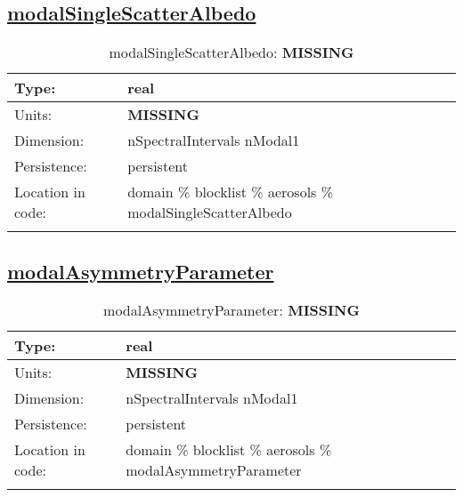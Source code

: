 \subsection[modalSingleScatterAlbedo]{\hyperref[sec:var_tab_aerosols]{modalSingleScatterAlbedo}}
\label{subsec:var_sec_aerosols_modalSingleScatterAlbedo}
\begin{center}
\begin{longtable}{| p{2.0in} | p{4.0in} |}
        \hline 
        Type: & real \\
        \hline 
        Units: & {\bf \color{red} MISSING} \\
        \hline 
        Dimension: & nSpectralIntervals nModal1 \\
        \hline 
        Persistence: & persistent \\
        \hline 
         Location in code: & domain \% blocklist \% aerosols \% modalSingleScatterAlbedo \\
         \hline 
    \caption{modalSingleScatterAlbedo: {\bf \color{red} MISSING}}
\end{longtable}
\end{center}
\subsection[modalAsymmetryParameter]{\hyperref[sec:var_tab_aerosols]{modalAsymmetryParameter}}
\label{subsec:var_sec_aerosols_modalAsymmetryParameter}
\begin{center}
\begin{longtable}{| p{2.0in} | p{4.0in} |}
        \hline 
        Type: & real \\
        \hline 
        Units: & {\bf \color{red} MISSING} \\
        \hline 
        Dimension: & nSpectralIntervals nModal1 \\
        \hline 
        Persistence: & persistent \\
        \hline 
         Location in code: & domain \% blocklist \% aerosols \% modalAsymmetryParameter \\
         \hline 
    \caption{modalAsymmetryParameter: {\bf \color{red} MISSING}}
\end{longtable}
\end{center}

